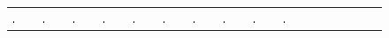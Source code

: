 \documentclass[letterpaper]{article} %
\begin{document}
\begin{figure}[!h]
  
  \centering
  \renewcommand{\arraystretch}{0.2}
  \begin{tabular}{ C{1.07cm}C{1.07cm}C{1.07cm}C{1.07cm}C{1.07cm}C{1.07cm}C{1.07cm}C{1.07cm}C{1.07cm}C{1.07cm}C{1.07cm}C{1.07cm}C{1.07cm}C{1.07cm}C{1.07cm}C{1.07cm} }

    \includegraphics[width=0.070\textwidth]{"images/supp_fig_mnist/seq_1/t_m_3"} &
    \includegraphics[width=0.070\textwidth]{"images/supp_fig_mnist/seq_1/t_m_2"} &
    \includegraphics[width=0.070\textwidth]{"images/supp_fig_mnist/seq_1/t_m_1"} &
    \includegraphics[width=0.070\textwidth]{"images/supp_fig_mnist/seq_1/t_m_0"} &
    \includegraphics[width=0.070\textwidth]{"images/supp_fig_mnist/seq_1/pred_0"}&
    \includegraphics[width=0.070\textwidth]{"images/supp_fig_mnist/seq_1/pred_1"}&
    \includegraphics[width=0.070\textwidth]{"images/supp_fig_mnist/seq_1/pred_2"}&
    \includegraphics[width=0.070\textwidth]{"images/supp_fig_mnist/seq_1/pred_3"}&
    \includegraphics[width=0.070\textwidth]{"images/supp_fig_mnist/seq_1/pred_4"}&
    \includegraphics[width=0.070\textwidth]{"images/supp_fig_mnist/seq_1/pred_5"}&

\end{tabular}
\end{figure}
\end{document}
